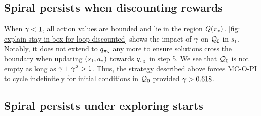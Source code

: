 \vspace{-0.1cm}

\subsection{Spiral persists when discounting rewards}

\vspace{-0.2cm}

When $\gamma < 1$, all action values are bounded and lie in the region $Q({\pi}_*)$.
\autoref{fig: explain stay in box for loop discounted} shows
the impact of $\gamma$ on $\mathcal{Q}_0$ in $s_1$.
Notably, it does not extend to $q_{\pi_5}$ any more to ensure solutions cross the boundary when updating $(s_1, {a}_*)$ towards $q_{\pi_5}$ in step 5.
We see that $\mathcal{Q}_0$ is not empty as long as $\gamma + \gamma^2 > 1$.
Thus, the strategy described above forces MC-O-PI to cycle indefinitely for initial conditions in $\mathcal{Q}_0$ provided $\gamma > 0.618$.

\vspace{-0.5cm}




\subsection{Spiral persists under exploring starts}
\label{sec: 3s es}

\vspace{-0.3cm}


